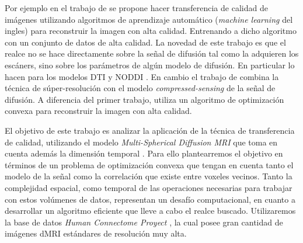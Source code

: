 \documentclass[a4paper,10pt]{article}
\begin{document}
Por ejemplo en el trabajo de \citet{Alexander2014} se propone hacer transferencia de 
calidad de imágenes utilizando algoritmos de aprendizaje automático 
(\textit{machine learning} del ingles) para reconstruir la imagen con alta 
calidad. Entrenando a dicho algoritmo con un conjunto de datos de alta 
calidad. La novedad de este trabajo es que el realce no se hace directamente 
sobre la señal de difusión tal como la adquieren los escáners, sino sobre los 
parámetros de algún modelo de difusión. En particular lo hacen para los modelos DTI y NODDI 
\citep{Zhang2012}. 
En cambio el trabajo de \citet{Ning2016} combina la 
t\'ecnica de súper-resolución con el modelo \textit{compressed-sensing} \citep{Naidoo2015} de la señal de difusión. A 
diferencia del primer trabajo, utiliza un algoritmo de 
optimización convexa para reconstruir la imagen con alta calidad.

El objetivo de este trabajo es analizar la aplicación de la técnica de 
transferencia de calidad, utilizando el modelo \textit{Multi-Spherical Diffusion MRI} que toma en cuenta además 
la dimensión temporal \citep{Fick}. Para ello plantearremos el objetivo en términos de un problema 
de optimización convexa que tengan en cuenta tanto el modelo de la se\~nal como la correlaci\'on 
que existe entre voxeles vecinos. Tanto la complejidad espacial, como temporal de las 
operaciones necesarias para trabajar con estos vol\'umenes de datos, representan un desafío 
computacional, en cuanto a desarrollar un algoritmo eficiente que lleve a cabo el realce buscado. 
Utilizaremos la base de datos \textit{Human Connectome Proyect} \citep{Barch2013}, la cual posee 
gran cantidad de imágenes dMRI estándares de resolución muy alta.



\clearpage


\end{document}
